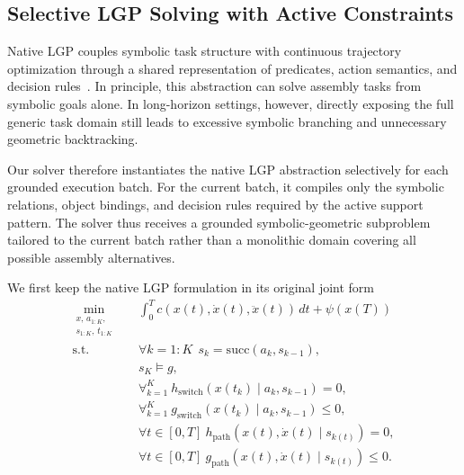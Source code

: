 \documentclass[journal]{IEEEtran}
\begin{document}
  \subsection{Selective LGP Solving with Active Constraints}
  \label{subsec:phase3}

  Native LGP couples symbolic task structure with continuous trajectory
  optimization through a shared representation of predicates, action semantics,
  and decision rules~\cite{cite_lgp_2015}. In principle, this abstraction can
  solve assembly tasks from symbolic goals alone. In long-horizon settings,
  however, directly exposing the full generic task domain still leads to
  excessive symbolic branching and unnecessary geometric backtracking.

  Our solver therefore instantiates the native LGP abstraction selectively for
  each grounded execution batch. For the current batch, it compiles only the
  symbolic relations, object bindings, and decision rules required by the active
  support pattern. The solver thus receives a grounded symbolic-geometric
  subproblem tailored to the current batch rather than a monolithic domain
  covering all possible assembly alternatives.

  We first keep the native LGP formulation in its original joint form~\cite{cite_lgp_2015}
  \begin{align}
    \min_{\substack{x,\,a_{1:K},\\ s_{1:K},\,t_{1:K}}}\quad
    &\int_0^T c\!\left(x(t),\dot{x}(t),\ddot{x}(t)\right)\,dt + \psi\!\left(x(T)\right)
    \label{eq:lgp_joint_objective}\\
    \text{s.t.}\quad
    &\forall k=1{:}K\ \ s_k = \mathrm{succ}(a_k, s_{k-1}),
    \label{eq:lgp_logic_transition}\\
    &s_K\models g,
    \label{eq:lgp_goal_constraint}\\
    &\forall_{k=1}^{K}\ h_{\mathrm{switch}}\!\left(x(t_k)\mid a_k,s_{k-1}\right)=0,
    \label{eq:lgp_switch_constraints_eq}\\
    &\forall_{k=1}^{K}\ g_{\mathrm{switch}}\!\left(x(t_k)\mid a_k,s_{k-1}\right)\le 0,
    \label{eq:lgp_switch_constraints_ineq}\\
    &\forall t\in[0,T]\ h_{\mathrm{path}}\!\left(x(t),\dot{x}(t)\mid s_{k(t)}\right)=0,
    \label{eq:lgp_path_constraints_eq}\\
    &\forall t\in[0,T]\ g_{\mathrm{path}}\!\left(x(t),\dot{x}(t)\mid s_{k(t)}\right)\le 0.
    \label{eq:lgp_path_constraints_ineq}
  \end{align}
\end{document}
